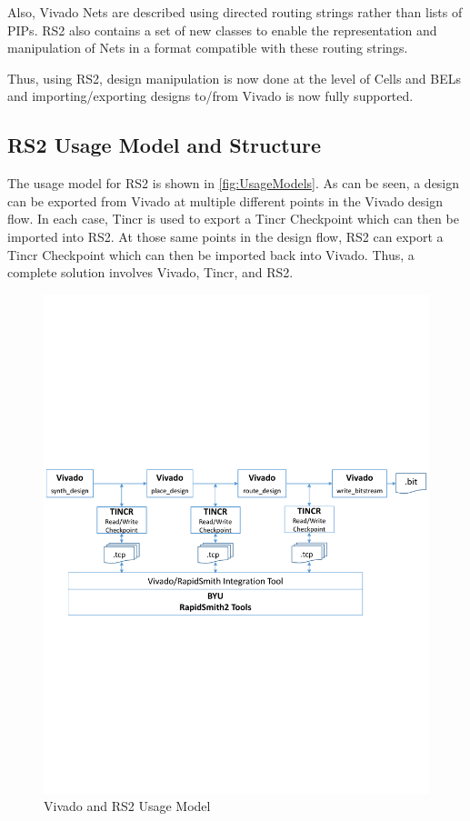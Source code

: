 \documentclass[10pt]{article}
\begin{document}
Also, Vivado Nets are described using directed routing strings rather than lists
of PIPs.  RS2 also contains a set of new classes to enable the representation
and manipulation of Nets in a format compatible with these routing strings.

Thus, using RS2, design manipulation is now done at the level of Cells and BELs
and importing/exporting designs to/from Vivado is now fully supported.

\subsection{RS2 Usage Model and Structure}
The usage model for RS2 is shown in \autoref{fig:UsageModels}.  As can be
seen, a design can be exported from Vivado at multiple different points in the
Vivado design flow.  In each case, Tincr is used to export a Tincr Checkpoint
which can then be imported into RS2.  At those same points in the design flow,
RS2 can export a Tincr Checkpoint which can then be imported back into Vivado. 
Thus, a complete solution involves Vivado, Tincr, and RS2.

\begin{figure}[htb]
\centering
\includegraphics[width=\columnwidth]{UsageModels}
\caption{Vivado and RS2 Usage Model}
\label{fig:UsageModels}
\end{figure} 
\end{document}
